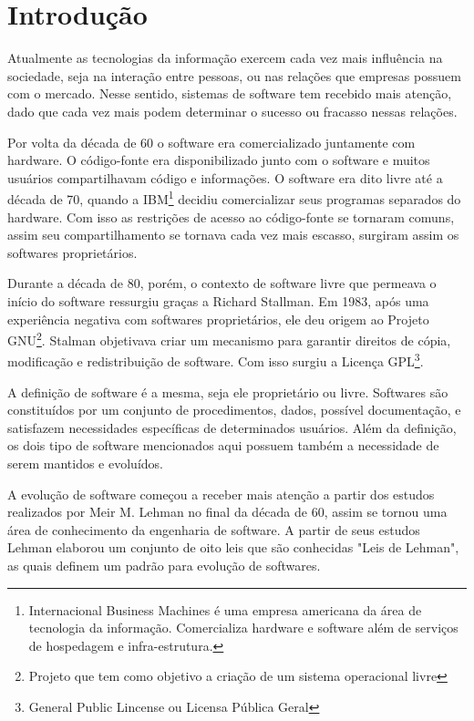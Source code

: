 \chapter{Introdução}

Atualmente as tecnologias da informação exercem cada vez mais influência na sociedade, seja na interação entre pessoas, ou nas relações que empresas possuem com o mercado. Nesse sentido, sistemas de software tem recebido mais atenção, dado que cada vez mais podem determinar o sucesso ou fracasso nessas relações.

Por volta da década de 60 o software era comercializado juntamente com hardware. O código-fonte era disponibilizado junto com o software e muitos usuários compartilhavam código e informações. O software era dito livre até a década de 70, quando a IBM\footnote{Internacional Business Machines é uma empresa americana da área de tecnologia da informação. Comercializa hardware e software além de serviços de hospedagem e infra-estrutura.} decidiu comercializar seus programas separados do hardware. Com isso as restrições de acesso ao código-fonte se tornaram comuns, assim seu compartilhamento se tornava cada vez mais escasso, surgiram assim os softwares proprietários.

Durante a década de 80, porém, o contexto de software livre que permeava o início do software  ressurgiu graças a Richard Stallman. Em 1983, após uma experiência negativa com softwares proprietários, ele deu origem ao Projeto GNU\footnote{Projeto que tem como objetivo a criação de um sistema operacional livre}. Stalman objetivava criar um mecanismo para garantir direitos de cópia, modificação e redistribuição de software. Com isso surgiu a Licença GPL\footnote{General Public Lincense ou Licensa Pública Geral}.

A definição de software é a mesma, seja ele proprietário ou livre. Softwares são constituídos por um conjunto de procedimentos, dados, possível documentação, e satisfazem necessidades específicas de determinados usuários. Além da definição, os dois tipo de software mencionados aqui possuem também a necessidade de serem mantidos e evoluídos.

A evolução de software começou a receber mais atenção a partir dos estudos realizados por Meir M. Lehman no final da década de 60, assim se tornou uma área de conhecimento da engenharia de software. A partir de seus estudos Lehman elaborou um conjunto de oito leis que são conhecidas "Leis de Lehman", as quais definem um padrão para evolução de softwares. 

